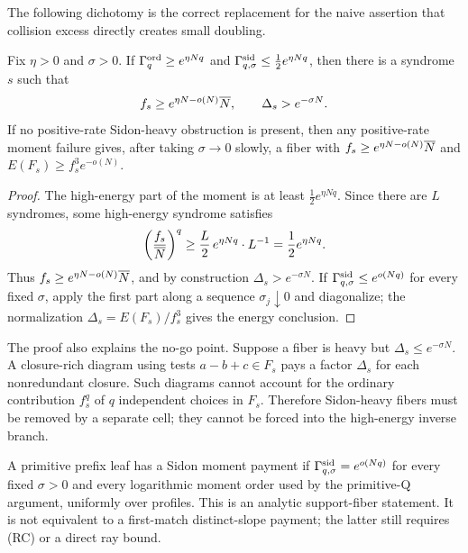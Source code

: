 \documentclass[11pt,a4paper]{amsart}
\numberwithin{equation}{section}
\theoremstyle{remark}
\begin{document}
The following dichotomy is the correct replacement for the naive assertion that collision excess directly creates small doubling.

\begin{proposition}\label{prop:ordinary-moment-split}
Fix \(\eta>0\) and \(\sigma>0\).  If \(\Gamma^{\rm ord}_q\ge e^{\eta Nq}\) and \(\Gamma^{\rm sid}_{q,\sigma}\le \frac12 e^{\eta Nq}\), then there is a syndrome \(s\) such that
\[
        f_s\ge e^{\eta N-o(N)}\overline N,
        \qquad
        \Delta_s>e^{-\sigma N}.
\]
If no positive-rate Sidon-heavy obstruction is present, then any positive-rate moment failure gives, after taking \(\sigma\to0\) slowly, a fiber with \(f_s\ge e^{\eta N-o(N)}\overline N\) and \(E(F_s)\ge f_s^3e^{-o(N)}\).
\end{proposition}

\begin{proof}
The high-energy part of the moment is at least \(\frac12e^{\eta Nq}\).  Since there are \(L\) syndromes, some high-energy syndrome satisfies
\[
        \left(\frac{f_s}{\overline N}\right)^q
        \ge \frac{L}{2}\,e^{\eta Nq}\cdot L^{-1}
        =\frac12 e^{\eta Nq}.
\]
Thus \(f_s\ge e^{\eta N-o(N)}\overline N\), and by construction \(\Delta_s>e^{-\sigma N}\).  If \(\Gamma^{\rm sid}_{q,\sigma}\le e^{o(Nq)}\) for every fixed \(\sigma\), apply the first part along a sequence \(\sigma_j\downarrow0\) and diagonalize; the normalization \(\Delta_s=E(F_s)/f_s^3\) gives the energy conclusion.
\end{proof}

The proof also explains the no-go point.  Suppose a fiber is heavy but \(\Delta_s\le e^{-\sigma N}\).  A closure-rich diagram using tests \(a-b+c\in F_s\) pays a factor \(\Delta_s\) for each nonredundant closure.  Such diagrams cannot account for the ordinary contribution \(f_s^q\) of \(q\) independent choices in \(F_s\).  Therefore Sidon-heavy fibers must be removed by a separate cell; they cannot be forced into the high-energy inverse branch.

\begin{definition}\label{def:sidon-paid-cell}
A primitive prefix leaf has a Sidon moment payment if
\(\Gamma^{\rm sid}_{q,\sigma}=e^{o(Nq)}\) for every fixed \(\sigma>0\) and every
logarithmic moment order used by the primitive-Q argument, uniformly over
profiles.  This is an analytic support-fiber statement.  It is not
equivalent to a first-match distinct-slope payment; the latter still
requires \textup{(RC)} or a direct ray bound.
\end{definition}
\end{document}
